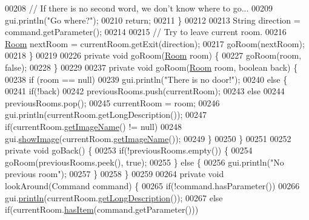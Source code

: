 \begin{DoxyCode}
{00208             \textcolor{comment}{// If there is no second word, we don't know where to go...}
00209             gui.println(\textcolor{stringliteral}{"Go where?"});
00210             \textcolor{keywordflow}{return};
00211         \}
00212 
00213         String direction = command.getParameter();
00214 
00215         \textcolor{comment}{// Try to leave current room.}
00216         \hyperlink{classRoom}{Room} nextRoom = currentRoom.getExit(direction);
00217         goRoom(nextRoom);
00218     \}
00219 
00226     \textcolor{keyword}{private} \textcolor{keywordtype}{void} goRoom(\hyperlink{classRoom}{Room} room) \{
00227         goRoom(room, \textcolor{keyword}{false});
00228     \}
00229 
00237     \textcolor{keyword}{private} \textcolor{keywordtype}{void} goRoom(\hyperlink{classRoom}{Room} room, \textcolor{keywordtype}{boolean} back) \{
00238         \textcolor{keywordflow}{if} (room == null)
00239             gui.println(\textcolor{stringliteral}{"There is no door!"});
00240         \textcolor{keywordflow}{else} \{
00241             \textcolor{keywordflow}{if}(!back)
00242                 previousRooms.push(currentRoom);
00243             \textcolor{keywordflow}{else}
00244                 previousRooms.pop();
00245             currentRoom = room;
00246             gui.println(currentRoom.getLongDescription());
00247             \textcolor{keywordflow}{if}(currentRoom.\hyperlink{classRoom_a8177668df4d8be718812934673c42649}{getImageName}() != null)
00248                 gui.\hyperlink{classUserInterface_ab793a0f12878c698ba3e1720a9f86f3b}{showImage}(currentRoom.\hyperlink{classRoom_a8177668df4d8be718812934673c42649}{getImageName}());
00249         \}
00250     \}
00251 
00252     \textcolor{keyword}{private} \textcolor{keywordtype}{void} goBack() \{ 
00253         \textcolor{keywordflow}{if}(!previousRooms.empty()) \{
00254             goRoom(previousRooms.peek(), \textcolor{keyword}{true});
00255         \} \textcolor{keywordflow}{else} \{
00256             gui.println(\textcolor{stringliteral}{"No previous room"});
00257         \}
00258     \}
00259 
00264     \textcolor{keyword}{private} \textcolor{keywordtype}{void} lookAround(Command command) \{
00265         \textcolor{keywordflow}{if}(!command.hasParameter())
00266             gui.\hyperlink{classUserInterface_a79f606b4b1f5d1523e50eea00039ed94}{println}(currentRoom.\hyperlink{classRoom_a23a25854d7544fb0b41190a4d6bd1322}{getLongDescription}());
00267         \textcolor{keywordflow}{else} \textcolor{keywordflow}{if}(currentRoom.\hyperlink{classRoom_ad779b367b26018c9f343ca3044c4b54f}{hasItem}(command.getParameter()))
}
\end{DoxyCode}
